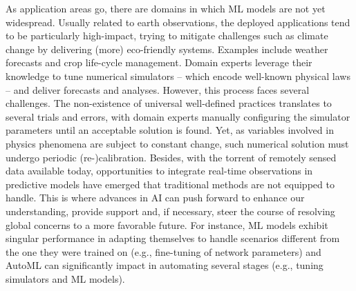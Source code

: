 As application areas go, there are domains in which ML models are not yet widespread.
Usually related to earth observations, the deployed applications tend to be particularly high-impact, trying to mitigate challenges such as climate change by delivering (more) eco-friendly systems.
Examples include weather forecasts and crop life-cycle management.
Domain experts leverage their knowledge to tune numerical simulators -- which encode well-known physical laws -- and deliver forecasts and analyses.
However, this process faces several challenges.
The non-existence of universal well-defined practices translates to several trials and errors, with domain experts manually configuring the simulator parameters until an acceptable solution is found.
Yet, as variables involved in physics phenomena are subject to constant change, such numerical solution must undergo periodic (re-)calibration.
Besides, with the torrent of remotely sensed data available today, opportunities to integrate real-time observations in predictive models have emerged that traditional methods are not equipped to handle.
This is where advances in AI can push forward to enhance our understanding, provide support and, if necessary, steer the course of resolving global concerns to a more favorable future.
For instance, ML models exhibit singular performance in adapting themselves to handle scenarios different from the one they were trained on (e.g., fine-tuning of network parameters) and AutoML can significantly impact in automating several stages (e.g., tuning simulators and ML models).

